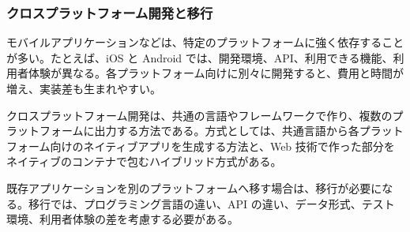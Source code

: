 \subsubsection{クロスプラットフォーム開発と移行}

モバイルアプリケーションなどは、特定のプラットフォームに強く依存することが多い。たとえば、iOS と Android では、開発環境、API、利用できる機能、利用者体験が異なる。各プラットフォーム向けに別々に開発すると、費用と時間が増え、実装差も生まれやすい。

クロスプラットフォーム開発は、共通の言語やフレームワークで作り、複数のプラットフォームに出力する方法である。方式としては、共通言語から各プラットフォーム向けのネイティブアプリを生成する方法と、Web 技術で作った部分をネイティブのコンテナで包むハイブリッド方式がある。

既存アプリケーションを別のプラットフォームへ移す場合は、移行が必要になる。移行では、プログラミング言語の違い、API の違い、データ形式、テスト環境、利用者体験の差を考慮する必要がある。
